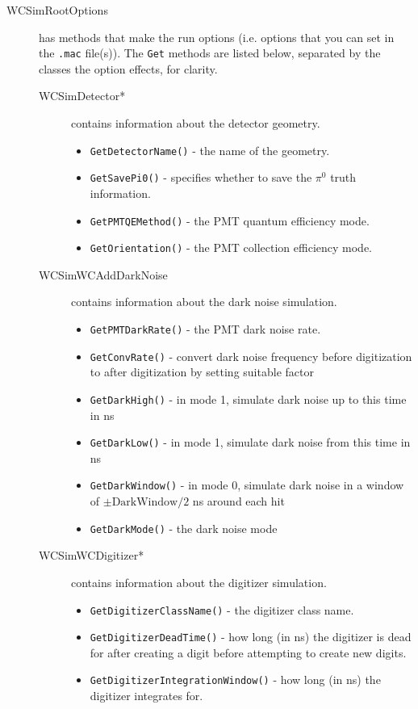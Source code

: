 \begin{description}
\item[WCSimRootOptions]  has methods that make the run options (i.e. options that you can set in the \texttt{.mac} file(s)). The \texttt{Get} methods are listed below, separated by the classes the option effects, for clarity.
  \begin{description}
  \item[WCSimDetector*] contains information about the detector geometry.
    \begin{itemize}
    \item \texttt{GetDetectorName()} - the name of the geometry.
    \item \texttt{GetSavePi0()} - specifies whether to save the $\pi^0$ truth information.
    \item \texttt{GetPMTQEMethod()} - the PMT quantum efficiency mode.
    \item \texttt{GetOrientation()} - the PMT collection efficiency mode.
    \end{itemize}
  \item[WCSimWCAddDarkNoise] contains information about the dark noise simulation.
    \begin{itemize}
    \item \texttt{GetPMTDarkRate()} - the PMT dark noise rate.
    \item \texttt{GetConvRate()} - convert dark noise frequency before digitization to after digitization by setting suitable factor
    \item \texttt{GetDarkHigh()} - in mode 1, simulate dark noise up to this time in ns
    \item \texttt{GetDarkLow()} - in mode 1, simulate dark noise from this time in ns
    \item \texttt{GetDarkWindow()} - in mode 0, simulate dark noise in a window of $\pm\textrm{DarkWindow}/2$ ns around each hit
    \item \texttt{GetDarkMode()} - the dark noise mode
    \end{itemize}
  \item[WCSimWCDigitizer*] contains information about the digitizer simulation.
    \begin{itemize}
    \item \texttt{GetDigitizerClassName()} - the digitizer class name.
    \item \texttt{GetDigitizerDeadTime()} - how long (in ns) the digitizer is dead for after creating a digit before attempting to create new digits.
    \item \texttt{GetDigitizerIntegrationWindow()} - how long (in ns) the digitizer integrates for.

\end{itemize}
\end{description}
\end{description}
